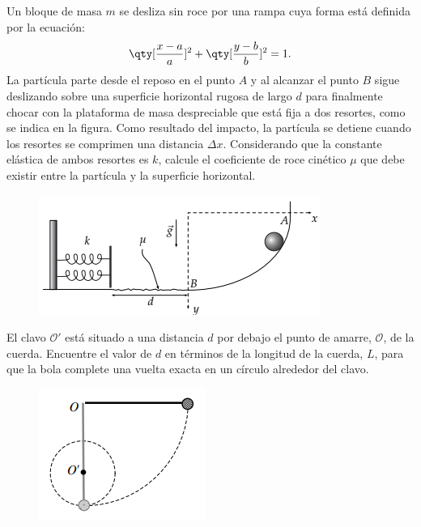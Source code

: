 \begin{ejercicio}
		Un bloque de masa $m$ se desliza sin roce por una rampa cuya forma está definida por la ecuación:
			$$ \qty[\frac{x - a}{a}]^2 + \qty[\frac{y - b}{b}]^2 = 1. $$
		La partícula parte desde el reposo en el punto $A$ y al alcanzar el punto $B$ sigue deslizando sobre una superficie horizontal rugosa de largo $d$ para finalmente chocar con la plataforma de masa despreciable que está fija a dos resortes, como se indica en la figura. Como resultado del impacto, la partícula se detiene cuando los resortes se comprimen una distancia $\Delta x$. Considerando que la constante elástica de ambos resortes es $k$, calcule el coeficiente de roce cinético $\mu$ que debe existir entre la partícula y la superficie horizontal.
		\begin{figure}[H]
			\centering
			\includegraphics[scale=0.5]{./img/p1.png}
		\end{figure}
	\end{ejercicio}





\begin{ejercicio}
		El clavo $\mathcal{O}'$ está situado a una distancia $d$ por debajo el punto de amarre, $\mathcal{O}$, de la cuerda. Encuentre el valor de $d$ en términos de la longitud de la cuerda, $L$, para que la bola complete una vuelta exacta en un círculo alrededor del clavo.
		\begin{figure}[H]
			\centering
			\includegraphics[scale=0.5]{./img/p2.png}
		\end{figure}
	\end{ejercicio}










